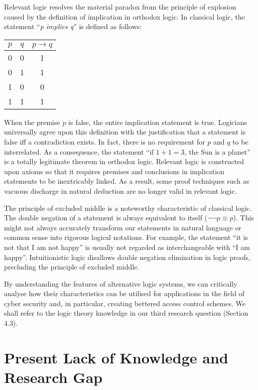 \documentclass{article}
\begin{document}
Relevant logic resolves the material paradox from the principle of explosion caused by the definition of implication in orthodox logic. In classical logic, the statement ``\textit{p implies q}'' is defined as follows:
\begin{center}
\begin{tabular}{cc|c}
    $p$ & $q$ & $p \to q$\\
    \hline
    0 & 0 & 1\\
    0 & 1 & 1\\
    1 & 0 & 0\\
    1 & 1 & 1
\end{tabular}
\end{center}
When the premise $p$ is false, the entire implication statement is true. Logicians universally agree upon this definition with the justification that a statement is false iff a contradiction exists. In fact, there is no requirement for $p$ and $q$ to be interrelated. As a consequence, the statement ``if $1 + 1 = 3$, the Sun is a planet'' is a totally legitimate theorem in orthodox logic. Relevant logic is constructed upon axioms so that it requires premises and conclusions in implication statements to be inextricably linked. As a result, some proof techniques such as vacuous discharge in natural deduction are no longer valid in relevant logic.\cite{relevant-logic}

The principle of excluded middle is a noteworthy characteristic of classical logic. The double negation of a statement is always equivalent to itself ($\neg \neg p \equiv p$). This might not always accurately transform our statements in natural language or common sense into rigorous logical notations. For example, the statement ``it is not that I am not happy'' is usually not regarded as interchangeable with ``I am happy''. Intuitionistic logic disallows double negation elimination in logic proofs, precluding the principle of excluded middle.\cite{alternative-logic}

By understanding the features of alternative logic systems, we can critically analyse how their characteristics can be utilised for applications in the field of cyber security and, in particular, creating bettered access control schemes. We shall refer to the logic theory knowledge in our third research question (Section 4.3).

\section{Present Lack of Knowledge and Research Gap}
\end{document}
